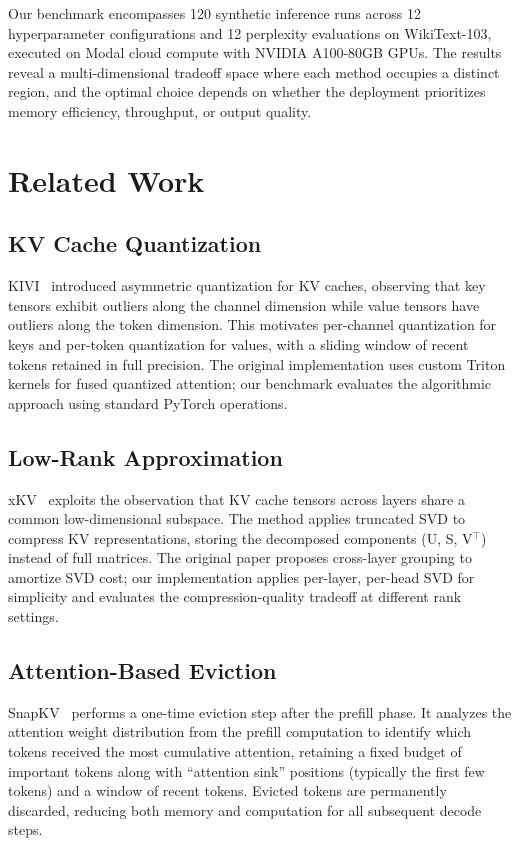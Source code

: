 \documentclass[conference]{IEEEtran}
\begin{document}
Our benchmark encompasses 120 synthetic inference runs across 12 hyperparameter configurations and 12 perplexity evaluations on WikiText-103, executed on Modal cloud compute with NVIDIA A100-80GB GPUs. The results reveal a multi-dimensional tradeoff space where each method occupies a distinct region, and the optimal choice depends on whether the deployment prioritizes memory efficiency, throughput, or output quality.

\section{Related Work}

\subsection{KV Cache Quantization}
KIVI~\cite{kivi} introduced asymmetric quantization for KV caches, observing that key tensors exhibit outliers along the channel dimension while value tensors have outliers along the token dimension. This motivates per-channel quantization for keys and per-token quantization for values, with a sliding window of recent tokens retained in full precision. The original implementation uses custom Triton kernels for fused quantized attention; our benchmark evaluates the algorithmic approach using standard PyTorch operations.

\subsection{Low-Rank Approximation}
xKV~\cite{xkv} exploits the observation that KV cache tensors across layers share a common low-dimensional subspace. The method applies truncated SVD to compress KV representations, storing the decomposed components (U, S, V$^{\top}$) instead of full matrices. The original paper proposes cross-layer grouping to amortize SVD cost; our implementation applies per-layer, per-head SVD for simplicity and evaluates the compression-quality tradeoff at different rank settings.

\subsection{Attention-Based Eviction}
SnapKV~\cite{snapkv} performs a one-time eviction step after the prefill phase. It analyzes the attention weight distribution from the prefill computation to identify which tokens received the most cumulative attention, retaining a fixed budget of important tokens along with ``attention sink'' positions (typically the first few tokens) and a window of recent tokens. Evicted tokens are permanently discarded, reducing both memory and computation for all subsequent decode steps.
\end{document}
